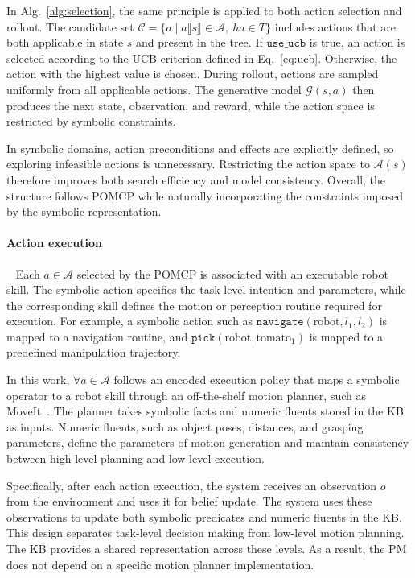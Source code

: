 In Alg.~\ref{alg:selection}, the same principle is applied to both action selection and rollout. The candidate set $\mathcal{C} = \{a \mid a\llbracket s \rrbracket \in \mathcal{A},\ ha \in T\}$ includes actions that are both applicable in state $s$ and present in the tree. If $\texttt{use\_ucb}$ is true, an action is selected according to the UCB criterion defined in Eq.~\ref{eq:ucb}. Otherwise, the action with the highest value is chosen. During rollout, actions are sampled uniformly from all applicable actions. The generative model $\mathcal{G}(s,a)$ then produces the next state, observation, and reward, while the action space is restricted by symbolic constraints.

In symbolic domains, action preconditions and effects are explicitly defined, so exploring infeasible actions is unnecessary. Restricting the action space to $\mathcal{A}(s)$ therefore improves both search efficiency and model consistency. Overall, the structure follows POMCP while naturally incorporating the constraints imposed by the symbolic representation.

\paragraph{Action execution}~\label{method:action_execution}
Each $a \in \mathcal{A}$ selected by the POMCP is associated with an executable robot skill. The symbolic action specifies the task-level intention and parameters, while the corresponding skill defines the motion or perception routine required for execution. For example, a symbolic action such as $\texttt{navigate}(\text{robot}, l_1, l_2)$ is mapped to a navigation routine, and $\texttt{pick}(\text{robot}, \text{tomato}_1)$ is mapped to a predefined manipulation trajectory.

In this work, $\forall a \in \mathcal{A}$ follows an encoded execution policy that maps a symbolic operator to a robot skill through an off-the-shelf motion planner, such as MoveIt~\cite{chitta2012moveit}. The planner takes symbolic facts and numeric fluents stored in the KB as inputs. Numeric fluents, such as object poses, distances, and grasping parameters, define the parameters of motion generation and maintain consistency between high-level planning and low-level execution.

Specifically, after each action execution, the system receives an observation $o$ from the environment and uses it for belief update. The system uses these observations to update both symbolic predicates and numeric fluents in the KB. This design separates task-level decision making from low-level motion planning. The KB provides a shared representation across these levels. As a result, the PM does not depend on a specific motion planner implementation.



